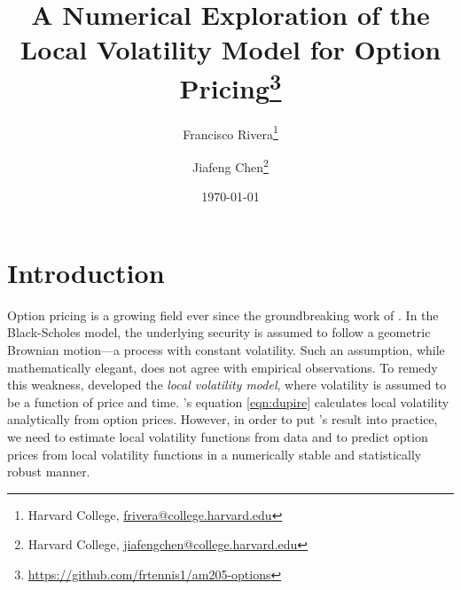\documentclass[11pt]{article}
\numberwithin{equation}{section}
\begin{document}
\title{A Numerical Exploration of the Local Volatility Model for Option
Pricing\footnote{\url{https://github.com/frtennis1/am205-options}}}
\author{Francisco Rivera\thanks{Harvard College, 
\href{mailto:frivera@college.harvard.edu}{frivera@college.harvard.edu} 
} \and Jiafeng Chen\thanks{Harvard College,
\href{mailto:jiafengchen@college.harvard.edu}{jiafengchen@college.harvard.edu}}}
\date{\today}

\maketitle




\section{Introduction}

Option pricing is a growing field ever since the groundbreaking work of
\cite{black1973pricing}. In the Black-Scholes model, the underlying security is
assumed to follow a geometric Brownian motion---a process with constant
volatility. Such an assumption, while mathematically elegant, does not agree
with empirical observations. To remedy this weakness, \cite{dupire1997pricing}
developed the \emph{local volatility model}, where volatility is assumed to be a
function of price and time. \cite{dupire1997pricing}'s equation
\eqref{eqn:dupire} calculates local volatility analytically from option prices.
However, in order to put \cite{dupire1997pricing}'s result into practice, we
need to estimate local volatility functions from data and to predict option
prices from local volatility functions in a numerically stable and statistically
robust manner.
\end{document}
